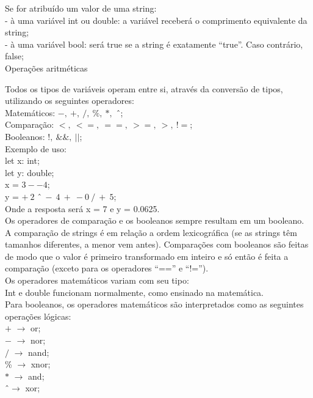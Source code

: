 \documentclass[12pt,a4paper]{article}
\begin{document}
Se for atribuído um valor de uma string:\\[0.15cm]
- à uma variável int ou double: a variável receberá o comprimento equivalente da string;\\
- à uma variável bool: será true se a string é exatamente ``true''. Caso contrário, false;\\

\hypertarget{label3}{\Large{Operações aritméticas}}\\[0.3cm]
\normalsize

Todos os tipos de variáveis operam entre si, através da conversão de tipos, utilizando os seguintes operadores:\\[0.2cm]
Matemáticos: $-,\ +,\ /,\ \%,\ *,$ \^\ ;\\
Comparação: $<,\ <=,\ ==,\ >=,\ >,\ !=$;\\
Booleanos: $!,\ \&\&,\ ||$;\\[0.6cm]
Exemplo de uso:\\[0.3cm]
let x: int;\\
let y: double;\\

x = $3--4$;\\

y = $+\ 2$ \^\ $\ -\ 4\ +\ -0\ /\ +\ 5$;\\[0.5cm]
Onde a resposta será x = 7 e y = 0.0625.\\


Os operadores de comparação e os booleanos sempre resultam em um booleano. A comparação de strings é em relação a ordem lexicográfica (se as strings têm tamanhos diferentes, a menor vem antes). Comparações com booleanos são feitas de modo que o valor é primeiro transformado em inteiro e só então é feita a comparação (exceto para os operadores ``=='' e ``!='').\\

Os operadores matemáticos variam com seu tipo:\\
Int e double funcionam normalmente, como ensinado na matemática.\\

Para booleanos, os operadores matemáticos são interpretados como as seguintes operações lógicas:\\[0.2cm]
$+$ $\rightarrow$ or;\\
$-$ $\rightarrow$ nor;\\
$/$ $\rightarrow$ nand;\\
\% $\rightarrow$ xnor;\\
$*$ $\rightarrow$ and;\\
\^ \ $\rightarrow$ xor;\\
\end{document}
